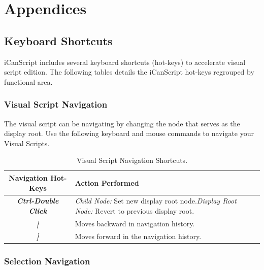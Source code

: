 \pagebreak 

\part{Appendices}
\label{appendices}

\chapter{Keyboard Shortcuts}
\label{keyboardshortcuts}

iCanScript includes several keyboard shortcuts (hot-keys) to accelerate visual script edition. The following tables details the iCanScript hot-keys regrouped by functional area.

\section{Visual Script Navigation}
\label{visualscriptnavigation}

The visual script can be navigating by changing the node that serves as the display root. Use the following keyboard and mouse commands to navigate your Visual Scripts.

\begin{table}[htbp]
\begin{minipage}{\linewidth}
\setlength{\tymax}{0.5\linewidth}
\centering
\small
\caption{Visual Script Navigation Shortcuts.}
\label{visualscriptnavigationshortcuts.}
\begin{tabulary}{\textwidth}{@{}CL@{}} \toprule
Navigation Hot-Keys&Action Performed\\
\midrule
\emph{\textbf{Ctrl-Double Click}}&\emph{Child Node:} Set new display root node.\emph{Display Root Node:} Revert to previous display root.\\
\emph{\textbf{[}}&Moves backward in navigation history.\\
\emph{\textbf{]}}&Moves forward in the navigation history.\\

\bottomrule

\end{tabulary}
\end{minipage}
\end{table}

\section{Selection Navigation}
\label{selectionnavigation}

